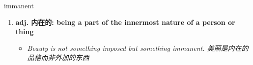 
\begin{frame}
{\huge immanent}
\begin{center}
\begin{enumerate}\Large
  \item \textbf{adj. 内在的: being a part of the innermost nature of a person or thing}
  \begin{itemize}
    \item \em{\Large{Beauty is not something imposed but something immanent. 美丽是内在的品格而非外加的东西}}
  \end{itemize}
\end{enumerate}
\end{center}
\end{frame}
